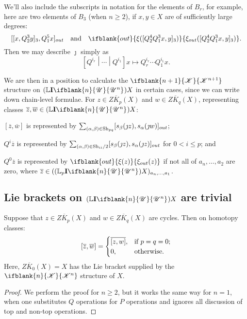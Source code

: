 \documentclass[10pt]{article}
\newcommand{\LL}[1]{\ifblank{#1}{\scrK}{\scrK^{#1}}}
\newcommand{\nontop}[1]{\ifblank{#1}{\scrU}{\scrU^{#1}}}
\newcommand{\Ind}[2][]{\mathbf{I}{#2}_{#1}}%
\newcommand{\Fr}[2][]{\ifblank{#1}{#2}{#2_{#1}}}
\newcommand{\restn}[2][]{\ifblank{#1}{\xi{#2}}{\xi_{#1}{#2}}}%
\newcommand{\derived}{\mathbb{L}}
\renewcommand{\Q}{Q}
\newcommand{\Shuffles}[2]{\textup{Sh}_{#1#2}}
\newcommand{\HalfShuffles}[2]{\textup{Sh}_{#1#2}/2}
\begin{document}
\begin{LieLambdaStructureOnKoszul}
We'll also include the subscripts in notation for the elements of $B_r$, for example, here are two elements of $B_3$ (when $n\geq2$), if $x,y\in X$ are of sufficiently large degrees:
\[[[x,\Q^3_2y]_3,\Q^5_1x]_{out}\textup{\quad and\quad }\restn[out]{([\Q^4_2\Q^3_1x,y]_3)}.\]
Then we may describe $\jmath$ simply as
\[\left[\Q^{i_{r}} \middle|\cdots\middle|\Q^{i_{1}} \right]x\mapsto\Q^{i_{r}}_r\cdots \Q^{i_{1}}_1x.\]


We are then in a position to calculate the $\LL{n+1}$ structure on $(\derived\Ind{\nontop{n}})X$ in certain cases, since we can write down chain-level formulae. For $z\in Z\overline{K}_p(X)$ and $w\in Z\overline{K}_q(X)$, representing classes $\overline{z},\overline{w}\in(\derived\Ind{\nontop{n}})X$:
\begin{itemise}
\setlength{\parindent}{.25in}
\item $[\overline{z},\overline{w}]$ is represented by $\sum_{(\alpha,\beta)\in\Shuffles{p}{q}}[s_\beta(\jmath z), s_\alpha(\jmath w)]_{out}$;
\item $Q^i\overline{z}$ is represented by $\sum_{(\alpha,\beta)\in\HalfShuffles{i}{i}}[s_\beta(\jmath z), s_\alpha(\jmath z)]_{out}$ for $0<i\leq p$; and
\item $Q^0\overline{z}$ is represented by $\restn[out]{(z)}$ if not all of $a_n,\ldots,a_2$ are zero, where $\overline{z}\in((\derived_{p}\Ind{\nontop{n}})X)_{a_n,\ldots,a_1}$.
\end{itemise}
\subsection{Lie brackets on $(\derived\Ind{\nontop{n}})X$ are trivial}
\begin{prop}
Suppose that $z\in Z\overline{K}_p(X)$ and $w\in Z\overline{K}_q(X)$ are cycles. Then on homotopy classes:%
\[[\overline{z},\overline{w}]=\begin{cases}
\overline{[z,w]},&\textup{if }p=q=0;\\
0,&\textup{otherwise}.
\end{cases}
\]
Here, $Z\overline{K}_0(X)=X$ has the Lie bracket supplied by the $\LL{n}$ structure of $X$.
\end{prop}
\begin{proof}
We perform the proof for $n\geq2$, but it works the same way for $n=1$, when one substitutes $\Q$ operations for $P$ operations and ignores all discussion of top and non-top operations.


\end{proof}
\end{LieLambdaStructureOnKoszul}
\end{document}
